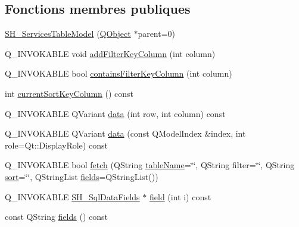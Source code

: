 \subsection*{Fonctions membres publiques}
\begin{DoxyCompactItemize}
\item 
\hyperlink{classSimpleHotel_1_1SH__ServicesTableModel_a109c343989f5fec1ed380c2bcc50c432}{S\-H\-\_\-\-Services\-Table\-Model} (\hyperlink{classQObject}{Q\-Object} $\ast$parent=0)
\item 
Q\-\_\-\-I\-N\-V\-O\-K\-A\-B\-L\-E void \hyperlink{classSimpleHotel_1_1SH__ExtendedProxyModel_af8036ffa208ebaf55129cce307c3e296}{add\-Filter\-Key\-Column} (int column)
\item 
Q\-\_\-\-I\-N\-V\-O\-K\-A\-B\-L\-E bool \hyperlink{classSimpleHotel_1_1SH__ExtendedProxyModel_a4db5231a36976dd249ec1439422e331c}{contains\-Filter\-Key\-Column} (int column)
\item 
int \hyperlink{classSimpleHotel_1_1SH__ExtendedProxyModel_a2acd8779c72617f4b6a195ee9341b28b}{current\-Sort\-Key\-Column} () const 
\item 
Q\-\_\-\-I\-N\-V\-O\-K\-A\-B\-L\-E Q\-Variant \hyperlink{classSimpleHotel_1_1SH__ExtendedProxyModel_a24edf7c777ce9e00a07b30614ee71019}{data} (int row, int column) const 
\item 
Q\-\_\-\-I\-N\-V\-O\-K\-A\-B\-L\-E Q\-Variant \hyperlink{classSimpleHotel_1_1SH__ExtendedProxyModel_a25bc1047c6e9835d9d3c580e0a4ec42a}{data} (const Q\-Model\-Index \&index, int role=Qt\-::\-Display\-Role) const 
\item 
Q\-\_\-\-I\-N\-V\-O\-K\-A\-B\-L\-E bool \hyperlink{classSimpleHotel_1_1SH__ExtendedProxyModel_a422dc77c44ec3ded9291812efb128053}{fetch} (Q\-String \hyperlink{classSimpleHotel_1_1SH__ExtendedProxyModel_a49617ea8bab745425beec3dbd3fddba7}{table\-Name}=\char`\"{}\char`\"{}, Q\-String filter=\char`\"{}\char`\"{}, Q\-String \hyperlink{classSimpleHotel_1_1SH__ExtendedProxyModel_a5d7686a9fae295e0662057b8450c8a8d}{sort}=\char`\"{}\char`\"{}, Q\-String\-List \hyperlink{classSimpleHotel_1_1SH__ExtendedProxyModel_a4b57bc85b18fa1e71073526abb798fb6}{fields}=Q\-String\-List())
\item 
Q\-\_\-\-I\-N\-V\-O\-K\-A\-B\-L\-E \hyperlink{classSimpleHotel_1_1SH__SqlDataFields}{S\-H\-\_\-\-Sql\-Data\-Fields} $\ast$ \hyperlink{classSimpleHotel_1_1SH__ExtendedProxyModel_ac091225266a35c84307835f40d9b6e9b}{field} (int i) const 
\item 
const Q\-String \hyperlink{classSimpleHotel_1_1SH__ExtendedProxyModel_a4b57bc85b18fa1e71073526abb798fb6}{fields} () const 

\end{DoxyCompactItemize}
